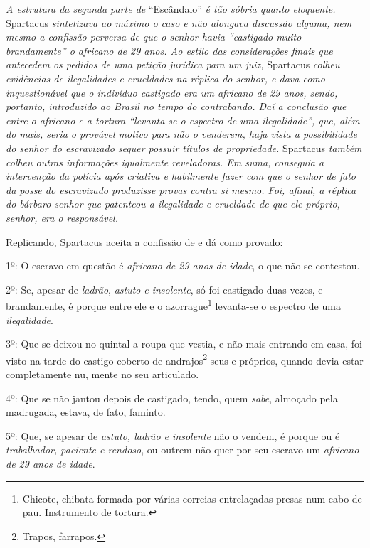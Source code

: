 {\begin{didascalia}
\emph{A estrutura da segunda parte de} ``Escândalo'' \emph{é tão sóbria
quanto eloquente.} Spartacus \emph{sintetizava ao máximo o caso e não
alongava discussão alguma, nem mesmo a confissão perversa de que o
senhor havia ``castigado muito brandamente'' o africano de 29 anos. Ao
estilo das considerações finais que antecedem os pedidos de uma petição
jurídica para um juiz,} Spartacus \emph{colheu evidências de
ilegalidades e crueldades na réplica do senhor, e dava como
inquestionável que o indivíduo castigado era um africano de 29 anos,
sendo, portanto, introduzido ao Brasil no tempo do contrabando. Daí a
conclusão que entre o africano e a tortura ``levanta-se o espectro de uma
ilegalidade'', que, além do mais, seria o provável motivo para não o
venderem, haja vista a possibilidade do senhor do escravizado sequer
possuir títulos de propriedade.} Spartacus \emph{também colheu outras
informações igualmente reveladoras. Em suma, conseguia a intervenção da
polícia após criativa e habilmente fazer com que o senhor de fato da
posse do escravizado produzisse provas contra si mesmo. Foi, afinal, a
réplica do bárbaro senhor que patenteou a ilegalidade e crueldade de que
ele próprio, senhor, era o responsável.}
\end{didascalia}


Replicando, Spartacus aceita a confissão de \asterisc{} e dá como provado:

1º: O escravo em questão é \emph{africano de 29 anos de idade}, o que
não se contestou.

2º: Se, apesar de \emph{ladrão}, \emph{astuto} \emph{e insolente}, só
foi castigado duas vezes, e brandamente, é porque entre ele e o
azorrague\footnote{ Chicote, chibata formada por várias correias
  entrelaçadas presas num cabo de pau. Instrumento de tortura.}
levanta-se o espectro de uma \emph{ilegalidade}.

3º: Que se deixou no quintal a roupa que vestia, e não mais entrando em
casa, foi visto na tarde do castigo coberto de andrajos\footnote{
  Trapos, farrapos.} seus e próprios, quando devia estar completamente
nu, mente \asterisc{} no seu articulado.

4º: Que se não jantou depois de castigado, tendo, quem \emph{sabe},
almoçado pela madrugada, estava, de fato, faminto.

5º: Que, se apesar de \emph{astuto, ladrão e insolente} não o vendem, é
porque ou é \emph{trabalhador, paciente e rendoso}, ou outrem não quer
por seu escravo um \emph{africano de 29 anos de idade}.

}
